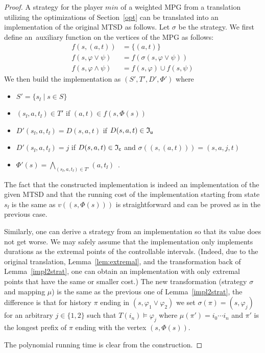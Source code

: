 \begin{proof}
A strategy for the player $min$ of a weighted MPG from a translation utilizing the optimizations of Section~\ref{opt} can be translated into an implementation of the original MTSD as follows. Let $\sigma$ be the strategy. We first define an~auxiliary function on the
vertices of the MPG as follows:
\begin{align*}
f(s,(a,t)) &= \{(a,t)\} \\
f(s,\varphi \vee \psi) &= f(\sigma(s,\varphi \vee \psi)) \\
f(s,\varphi \wedge \psi) &= f(s,\varphi) \cup f(s,\psi)
\end{align*}
We then build the implementation as $(S',T',D',\Phi')$ where
\begin{itemize}
\item $S' = \{  s_\ii \mid s \in S \}$
\item $(s_\ii,a,t_\ii) \in T'$ if $(a,t) \in f(s,\Phi(s))$
\item $D'(s_\ii,a,t_\ii) = D(s,a,t)$ if $D(s,a,t) \in \mathfrak I_\mathsf u$
\item $D'(s_\ii,a,t_\ii) = j$ if $D(s,a,t) \in \mathfrak I_\mathsf c$ and
	$\sigma((s,(a,t))) = (s,a,j,t)$
\item $\Phi'(s) = \bigwedge_{(s_\ii,a,t_\ii)\in T'} (a,t_\ii)$\ .
\end{itemize}
The fact that 
the constructed implementation is indeed an implementation of the given
MTSD and that the running cost of the implementation starting from state
$s_\ii$ is the same as $v((s,\Phi(s)))$ is straightforward and can be proved
as in the previous case.

Similarly, one can derive a strategy from an implementation so that its value does not get worse. We may safely assume that the implementation only implements durations as the extremal points of the controllable intervals. (Indeed, due to the original translation, Lemma~\ref{lem:extremal}, and the transformation back of Lemma~\ref{impl2strat}, one can obtain an implementation with only extremal points that have the same or smaller cost.) The new transformation (strategy $\sigma$ and mapping $\mu$) is the same as the previous one of Lemma~\ref{impl2strat}, the difference is that for history $\pi$ ending in $(s,\varphi_1\vee\varphi_2)$ we set $\sigma(\pi)=(s,\varphi_j)$ for an arbitrary $j\in\{1,2\}$ such that $T(i_n)\models\varphi_j$ where $\mu(\pi')=i_0\cdots i_n$ and $\pi'$ is the longest prefix of $\pi$ ending with the vertex $(s,\Phi(s))$. 

The polynomial running time is clear from the construction.
\end{proof}

